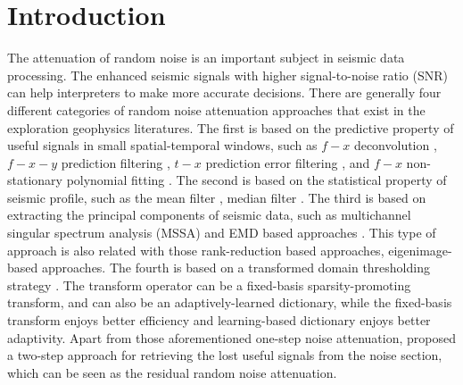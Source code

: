 \section{Introduction}
The attenuation of random noise is an important subject in seismic data processing. The enhanced seismic signals with higher signal-to-noise ratio (SNR) can help interpreters to make more accurate decisions. There are generally four different categories of random noise attenuation approaches that exist in the exploration geophysics literatures. The first is based on the predictive property of useful signals in small spatial-temporal windows, such as $f-x$ deconvolution \cite[]{canales,yangkang2014}, $f-x-y$ prediction filtering \cite[]{yanghua1999,yanghua2002}, $t-x$ prediction error filtering \cite[]{abma1995}, and $f-x$ non-stationary polynomial fitting \cite[]{guochang20112}.   The second is based on the statistical property of seismic profile, such as the mean filter \cite[]{nlm}, median filter \cite[]{yike2013,yangkang2014svmf,yangkang2014nmo}. The third is based on extracting the principal components of seismic data, such as multichannel singular spectrum analysis (MSSA) \cite[]{mssa,yangkang2015} and EMD based approaches \cite[]{yangkang2014emdsum}. This type of approach is also related with those rank-reduction based approaches, eigenimage-based approaches. The fourth is based on a transformed domain thresholding strategy \cite[]{curvelet,seislet,yangkang20142}. The transform operator can be a fixed-basis sparsity-promoting transform, and can also be an adaptively-learned dictionary, while the fixed-basis transform enjoys better efficiency and learning-based dictionary enjoys better adaptivity. Apart from those aforementioned one-step noise attenuation, \cite{yangkang2015ortho} proposed a two-step approach for retrieving the lost useful signals from the noise section, which can be seen as the residual random noise attenuation. 


